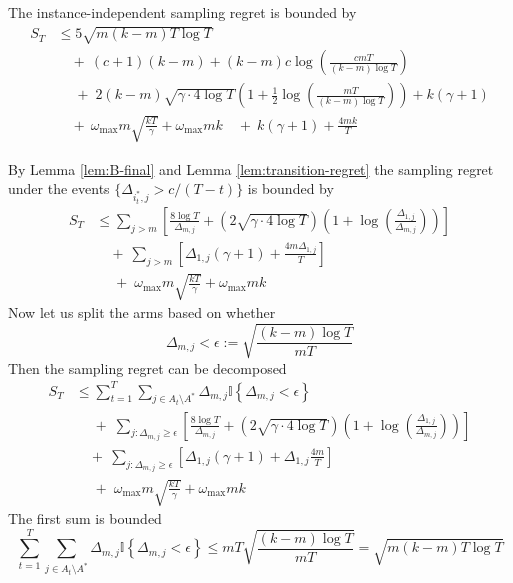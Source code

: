 \documentclass[opre,blindrev]{informs3}
\newcommand{\ind}[1]{\mathbb{I}\left\{#1\right\}}
\begin{document}
\begin{APPENDICES}
\begin{lemma}\label{lem:instance-independent-regret}
    The instance-independent sampling regret is bounded by
    \begin{align*}
        S_T&\leq 5\sqrt{m(k-m)T\log T}\\
        &\quad +~ (c+1)(k-m) +(k-m)c\log\left(\frac{cmT}{(k-m)\log T}\right)\\
        &\quad\;+\;2(k-m)\sqrt{\gamma \cdot 4\log T}\left(1+\frac{1}{2}\log\left(\frac{mT}{(k-m)\log T}\right)\right)+k(\gamma + 1)\\
        &\quad + ~\omega_{\max} m\sqrt{\frac{kT}{\gamma}} + \omega_{\max}mk
        \quad + ~ k(\gamma + 1) + \frac{4mk}{T}
    \end{align*}
\end{lemma}
    By Lemma \ref{lem:B-final} and Lemma \ref{lem:transition-regret} the sampling regret under the events \(\{\Delta_{i^*_t,j}>c/(T-t)\}\) is bounded by
    \begin{align*}
        S_T&\leq \sum_{j>m} \left[\frac{8\log T}{\Delta_{m,j}}+ \left(2\sqrt{\gamma \cdot 4\log T}\right)\left(1+\log\left(\frac{\Delta_{1,j}}{\Delta_{m,j}}\right)\right)\right]\\
        & \quad + ~\sum_{j>m} \left[\Delta_{1,j}(\gamma + 1) + \frac{4m\Delta_{1,j}}{T}\right]\\
        & \quad\;+\; \omega_{\max} m\sqrt{\frac{kT}{\gamma}} + \omega_{\max}mk
    \end{align*}
    Now let us split the arms based on whether 
    \[\Delta_{m,j}< \epsilon:=\sqrt{\frac{(k-m)\log T}{mT}}\]
    Then the sampling regret can be decomposed
    \begin{align*}
        S_T&\leq \sum_{t=1}^T\sum_{j\in A_t\setminus A^*}\Delta_{m,j}\ind{\Delta_{m,j}<\epsilon }\\
        &\quad\;+\;\sum_{j:\Delta_{m,j}\geq\epsilon} \left[\frac{8\log T}{\Delta_{m,j}}+ \left(2\sqrt{\gamma \cdot 4\log T}\right)\left(1+\log\left(\frac{\Delta_{1,j}}{\Delta_{m,j}}\right)\right)\right]\\
        & \quad + ~\sum_{j:\Delta_{m,j}\geq\epsilon} \left[\Delta_{1,j}(\gamma + 1) + \Delta_{1,j}\frac{4m}{T}\right]\\
        & \quad\;+\; \omega_{\max} m\sqrt{\frac{kT}{\gamma}} + \omega_{\max}mk
    \end{align*}
    The first sum is bounded
    \[\sum_{t=1}^T\sum_{j\in A_t\setminus A^*}\Delta_{m,j}\ind{\Delta_{m,j}<\epsilon }\leq mT\sqrt{\frac{(k-m)\log T}{mT}}=\sqrt{m(k-m)T\log T}\]

\end{APPENDICES}
\end{document}
